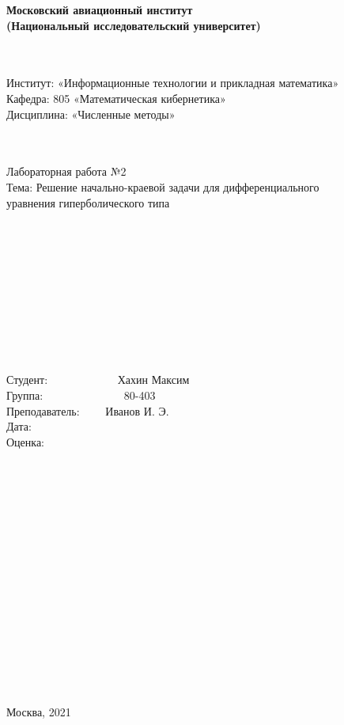 \documentclass[12pt]{article}
\begin{document}
    \begin{center}
        \textbf{Московский авиационный институт} \\
        \textbf{(Национальный исследовательский университет)}
    \end{center} 
    ~\\
    ~\\
    Институт: «Информационные технологии и прикладная математика» \\
    Кафедра: 805 «Математическая кибернетика»  \\
    Дисциплина: «Численные методы»  
    ~\\
    ~\\
    ~\\
    \begin{center}
        Лабораторная работа №2 \\
        Тема: Решение начально-краевой задачи для дифференциального\\ уравнения 
        гиперболического типа
    \end{center}
    ~\\
    ~\\
    ~\\
    ~\\
    ~\\
    ~\\
    ~\\
    ~\\
    ~\\
    \begin{flushright}
        Студент: ~~~~~~~~~~~~Хахин Максим~~~~~~\\
        Группа: ~~~~~~~~~~~~~~80-403~~~~~~~~~~~~~~~~~\\
        Преподаватель: ~~~~Иванов И. Э.~~~~~~~\\
        Дата: ~~~~~~~~~~~~~~~~~~~~~~~~~~~~~~~~~~~~~~~~~~~\\
        Оценка: ~~~~~~~~~~~~~~~~~~~~~~~~~~~~~~~~~~~~~~~~\\
    \end{flushright}
    ~\\
    ~\\
    ~\\
    ~\\
    ~\\
    ~\\
    ~\\
    ~\\
    ~\\
    ~\\
    ~\\
    ~\\
    ~\\
    ~\\
    ~\\
    \begin{center}
        Москва, 2021
    \end{center}
    \pagestyle{empty}
    \newpage
\end{document}
